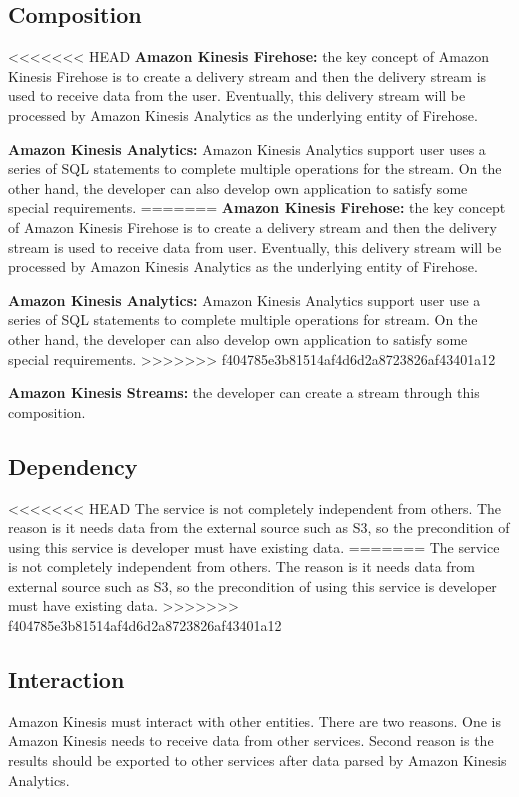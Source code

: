 	\subsection{Composition}
<<<<<<< HEAD
    \textbf{Amazon Kinesis Firehose:} the key concept of Amazon Kinesis Firehose is to create a delivery stream and then the delivery stream is used to receive data from the user. Eventually, this delivery stream will be processed by Amazon Kinesis Analytics as the underlying entity of Firehose.\cite{z3}
    
    \noindent \textbf{Amazon Kinesis Analytics:} Amazon Kinesis Analytics support user uses a series of SQL statements to complete multiple operations for the stream. On the other hand, the developer can also develop own application to satisfy some special requirements.
=======
    \textbf{Amazon Kinesis Firehose:} the key concept of Amazon Kinesis Firehose is to create a delivery stream and then the delivery stream is used to receive data from user. Eventually, this delivery stream will be processed by Amazon Kinesis Analytics as the underlying entity of Firehose\cite{z3}.
    
    \noindent \textbf{Amazon Kinesis Analytics:} Amazon Kinesis Analytics support user use a series of SQL statements to complete multiple operations for stream. On the other hand, the developer can also develop own application to satisfy some special requirements.
>>>>>>> f404785e3b81514af4d6d2a8723826af43401a12
     
    \noindent \textbf{Amazon Kinesis Streams:} the developer can create a stream through this composition.

	\subsection{Dependency}
<<<<<<< HEAD
    The service is not completely independent from others. The reason is it needs data from the external source such as S3, so the precondition of using this service is developer must have existing data.
=======
    The service is not completely independent from others. The reason is it needs data from external source such as S3, so the precondition of using this service is developer must have existing data.
>>>>>>> f404785e3b81514af4d6d2a8723826af43401a12

	\subsection{Interaction}
    Amazon Kinesis must interact with other entities. There are two reasons. One is Amazon Kinesis needs to receive data from other services. Second reason is the results should be exported to other services after data parsed by Amazon Kinesis Analytics. 

